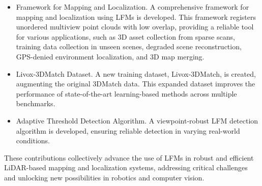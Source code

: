 \begin{itemize}
\item Framework for Mapping and Localization. A comprehensive framework for mapping and localization using LFMs is developed. This framework registers unordered multiview point clouds with low overlap, providing a reliable tool for various applications, such as 3D asset collection from sparse scans, training data collection in unseen scenes, degraded scene reconstruction, GPS-denied environment localization, and 3D map merging.

\item Livox-3DMatch Dataset. A new training dataset, Livox-3DMatch, is created, augmenting the original 3DMatch data. This expanded dataset improves the performance of state-of-the-art learning-based methods across multiple benchmarks.

\item Adaptive Threshold Detection Algorithm. A viewpoint-robust LFM detection algorithm is developed, ensuring reliable detection in varying real-world conditions.
\end{itemize}
These contributions collectively advance the use of LFMs in robust and efficient LiDAR-based mapping and localization systems, addressing critical challenges and unlocking new possibilities in robotics and computer vision.



